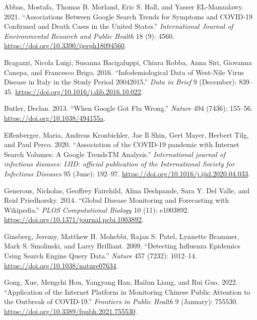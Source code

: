 \documentclass[
  12pt,
]{article}
\newlength{\cslhangindent}
\newenvironment{CSLReferences}[2] %
 {\begin{list}{}{%
  \setlength{\itemindent}{0pt}
  \setlength{\leftmargin}{0pt}
  \setlength{\parsep}{0pt}
  \ifodd #1
   \setlength{\leftmargin}{\cslhangindent}
   \setlength{\itemindent}{-1\cslhangindent}
  \fi
  \setlength{\itemsep}{#2\baselineskip}}}
 {\end{list}}
\begin{document}
\label{refs}
\begin{CSLReferences}{1}{0}
Abbas, Mostafa, Thomas B. Morland, Eric S. Hall, and Yasser
EL-Manzalawy. 2021. {``Associations Between Google Search Trends for
Symptoms and COVID-19 Confirmed and Death Cases in the United States.''}
\emph{International Journal of Environmental Research and Public Health}
18 (9): 4560. \url{https://doi.org/10.3390/ijerph18094560}.

Bragazzi, Nicola Luigi, Susanna Bacigaluppi, Chiara Robba, Anna Siri,
Giovanna Canepa, and Francesco Brigo. 2016. {``Infodemiological Data of
West-Nile Virus Disease in Italy in the Study Period
2004{\textendash}2015.''} \emph{Data in Brief} 9 (December): 839--45.
\url{https://doi.org/10.1016/j.dib.2016.10.022}.

Butler, Declan. 2013. {``When Google Got Flu Wrong.''} \emph{Nature} 494
(7436): 155--56. \url{https://doi.org/10.1038/494155a}.

Effenberger, Maria, Andreas Kronbichler, Jae Il Shin, Gert Mayer,
Herbert Tilg, and Paul Perco. 2020. {``Association of the COVID-19
pandemic with Internet Search Volumes: A Google TrendsTM Analysis.''}
\emph{International journal of infectious diseases: IJID: official
publication of the International Society for Infectious Diseases} 95
(June): 192--97. \url{https://doi.org/10.1016/j.ijid.2020.04.033}.

Generous, Nicholas, Geoffrey Fairchild, Alina Deshpande, Sara Y. Del
Valle, and Reid Priedhorsky. 2014. {``Global Disease Monitoring and
Forecasting with Wikipedia.''} \emph{PLOS Computational Biology} 10
(11): e1003892. \url{https://doi.org/10.1371/journal.pcbi.1003892}.

Ginsberg, Jeremy, Matthew H. Mohebbi, Rajan S. Patel, Lynnette Brammer,
Mark S. Smolinski, and Larry Brilliant. 2009. {``Detecting Influenza
Epidemics Using Search Engine Query Data.''} \emph{Nature} 457 (7232):
1012--14. \url{https://doi.org/10.1038/nature07634}.

Gong, Xue, Mengchi Hou, Yangyang Han, Hailun Liang, and Rui Guo. 2022.
{``Application of the Internet Platform in Monitoring Chinese Public
Attention to the Outbreak of COVID-19.''} \emph{Frontiers in Public
Health} 9 (January): 755530.
\url{https://doi.org/10.3389/fpubh.2021.755530}.


\end{CSLReferences}
\end{document}
